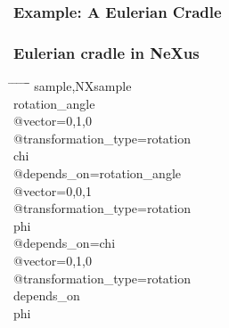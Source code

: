 \documentclass{beamer}
\begin{document}
\begin{frame} \frametitle{Example: A Eulerian Cradle}
\begin{figure}[!ht]
\end{figure}
\end{frame}

\begin{frame} \frametitle{Eulerian cradle in NeXus}
\begin{tabbing}
\hspace*{1cm} \= \hspace*{1cm} \= \hspace*{1cm} \= \hspace*{1cm} \= \hspace*{1cm} \= \hspace*{1cm}\= \kill
\>sample,NXsample\\
\> \>rotation\_angle\\
\> \> \>@vector=0,1,0\\
\> \> \>@transformation\_type=rotation\\
\> \>chi\\
\> \> \>@depends\_on=rotation\_angle\\
\> \> \>@vector=0,0,1\\
\> \> \>@transformation\_type=rotation\\
\> \>phi\\
\> \> \>@depends\_on=chi\\
\> \> \>@vector=0,1,0\\
\> \> \>@transformation\_type=rotation\\
\> \>depends\_on \\
\> \> \>phi \\
\end{tabbing}
\end{frame}
\end{document}
